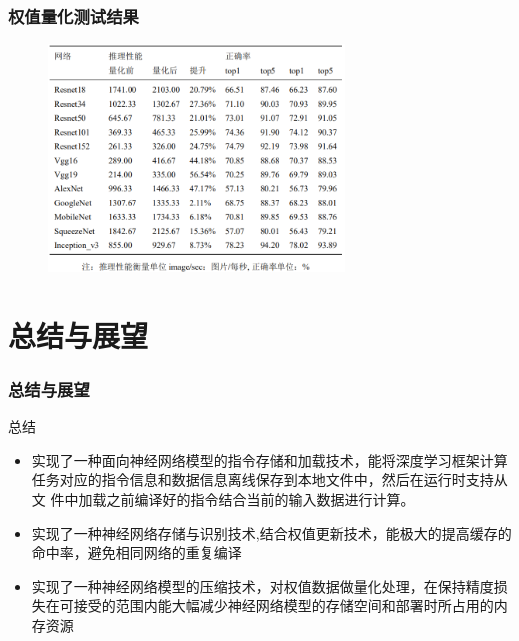 \documentclass[12pt]{ctexbeamer}
\begin{document}
\begin{frame}
  \frametitle{权值量化测试结果}
    \begin{figure}
	 \includegraphics[width=0.7\textwidth]{figures/quant_result.png}
    \end{figure}
\end{frame}


\section{总结与展望}
\begin{frame}
  \frametitle{总结与展望}
    \begin{block}{总结}
	 \begin{itemize}
          \item 实现了一种面向神经网络模型的指令存储和加载技术，能将深度学习框架计算任务对应的指令信息和数据信息离线保存到本地文件中，然后在运行时支持从文    件中加载之前编译好的指令结合当前的输入数据进行计算。
          \item 实现了一种神经网络存储与识别技术,结合权值更新技术，能极大的提高缓存的命中率，避免相同网络的重复编译
          \item 实现了一种神经网络模型的压缩技术，对权值数据做量化处理，在保持精度损失在可接受的范围内能大幅减少神经网络模型的存储空间和部署时所占用的内存资源
     	\end{itemize}
   \end{block}
\end{frame}
\end{document}
